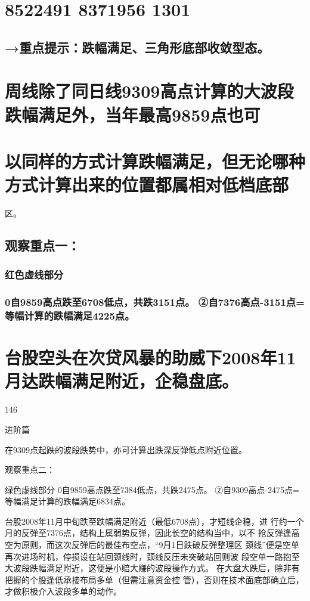 \documentclass{article}
\begin{document}
\section{8522491 8371956 1301}

\subsection{→重点提示：跌幅满足、三角形底部收敛型态。}

\section{周线除了同日线9309高点计算的大波段跌幅满足外，当年最高9859点也可}

\section{以同样的方式计算跌幅满足，但无论哪种方式计算出来的位置都属相对低档底部}

区。

\subsection{观察重点一：}

\subsubsection{红色虚线部分}

\subsubsection{0自9859高点跌至6708低点，共跌3151点。 ②自7376高点-3151点=等幅计算的跌幅满足4225点。}

\section{台股空头在次贷风暴的助威下2008年11月达跌幅满足附近，企稳盘底。}

146

\clearpage

进阶篇

在9309点起跌的波段跌势中，亦可计算出跌深反弹低点附近位置。

观察重点二：

绿色虚线部分 0自9859高点跌至7384低点，共跌2475点。 ②自9309高点-2475点=等幅满足计算的跌幅满足6834点。

台股2008年11月中旬跌至跌幅满足附近（最低6708点），才短线企稳，进 行约一个月的反弹至7376点，结构上属弱势反弹，因此长空的结构当中，以不 抢反弹逢高空为原则，而这次反弹后的最佳布空点，“9月1日跌破反弹整理区 颈线”便是空单再次进场时机，停损设在站回颈线时，颈线反压未突破站回则波 段空单一路抱至大波段跌幅满足附近，这便是小赔大赚的波段操作方式。 在大盘大跌后，除非有把握的个股逢低承接布局多单（但需注意资金控 管），否则在技术面底部确立后，才做积极介入波段多单的动作。
\end{document}
